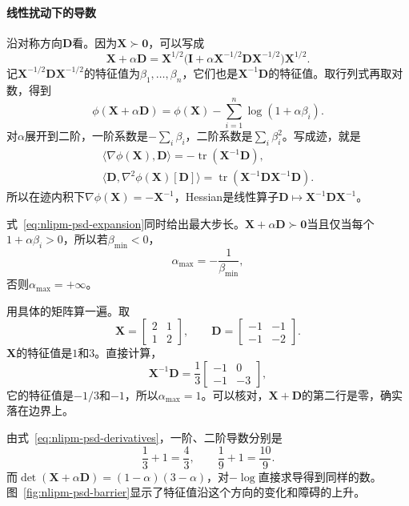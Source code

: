 \paragraph{线性扰动下的导数}
沿对称方向$\bm{D}$看。因为$\bm{X}\succ\bm{0}$，可以写成
\[
 \bm{X}+\alpha\bm{D}=\bm{X}^{1/2}\bigl(\bm{I}+\alpha\bm{X}^{-1/2}\bm{D}\bm{X}^{-1/2}\bigr)\bm{X}^{1/2}.
\]
记$\bm{X}^{-1/2}\bm{D}\bm{X}^{-1/2}$的特征值为$\beta_1,\ldots,\beta_n$，它们也是$\bm{X}^{-1}\bm{D}$的特征值。取行列式再取对数，得到
\begin{equation}
 \phi(\bm{X}+\alpha\bm{D})=\phi(\bm{X})-\sum_{i=1}^n\log(1+\alpha\beta_i).
 \label{eq:nlipm-psd-expansion}
\end{equation}
对$\alpha$展开到二阶，一阶系数是$-\sum_i\beta_i$，二阶系数是$\sum_i\beta_i^2$。写成迹，就是
\begin{equation}
 \begin{gathered}
 \langle\nabla\phi(\bm{X}),\bm{D}\rangle=-\operatorname{tr}(\bm{X}^{-1}\bm{D}),\\
 \langle\bm{D},\nabla^2\phi(\bm{X})[\bm{D}]\rangle=\operatorname{tr}(\bm{X}^{-1}\bm{D}\bm{X}^{-1}\bm{D}).
 \end{gathered}
 \label{eq:nlipm-psd-derivatives}
\end{equation}
所以在迹内积下$\nabla\phi(\bm{X})=-\bm{X}^{-1}$，Hessian是线性算子$\bm{D}\mapsto\bm{X}^{-1}\bm{D}\bm{X}^{-1}$。

式~\eqref{eq:nlipm-psd-expansion}同时给出最大步长。$\bm{X}+\alpha\bm{D}\succ\bm{0}$当且仅当每个$1+\alpha\beta_i>0$，所以若$\beta_{\min}<0$，
\begin{equation}
 \alpha_{\max}=-\frac{1}{\beta_{\min}},
 \label{eq:nlipm-psd-step}
\end{equation}
否则$\alpha_{\max}=+\infty$。

用具体的矩阵算一遍。取
\[
 \bm{X}=\begin{bmatrix}2&1\\1&2\end{bmatrix},\qquad\bm{D}=\begin{bmatrix}-1&-1\\-1&-2\end{bmatrix}.
\]
$\bm{X}$的特征值是$1$和$3$。直接计算，
\[
 \bm{X}^{-1}\bm{D}=\frac13\begin{bmatrix}-1&0\\-1&-3\end{bmatrix},
\]
它的特征值是$-1/3$和$-1$，所以$\alpha_{\max}=1$。可以核对，$\bm{X}+\bm{D}$的第二行是零，确实落在边界上。

由式~\eqref{eq:nlipm-psd-derivatives}，一阶、二阶导数分别是
\[
 \frac13+1=\frac43,\qquad\frac19+1=\frac{10}{9}.
\]
而$\det(\bm{X}+\alpha\bm{D})=(1-\alpha)(3-\alpha)$，对$-\log$直接求导得到同样的数。图~\ref{fig:nlipm-psd-barrier}显示了特征值沿这个方向的变化和障碍的上升。

